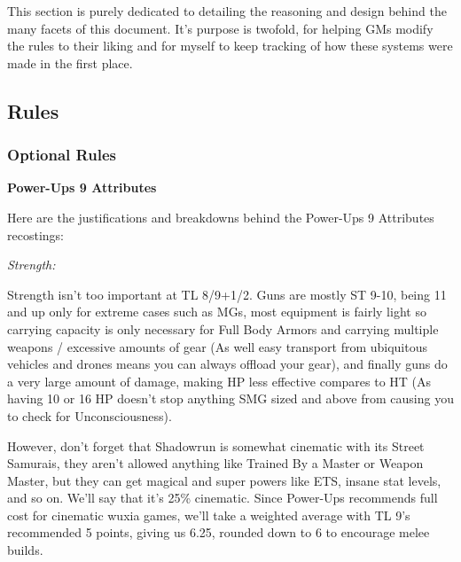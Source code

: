 


\begin{multicols*}{2}
	
	This section is purely dedicated to detailing the reasoning and design behind the many facets of this document. It's purpose is twofold, for helping GMs modify the rules to their liking and for myself to keep tracking of how these systems were made in the first place.
	
	\subsection{Rules}
	
	\subsubsection{Optional Rules}
	
	\textbf{Power-Ups 9 Attributes}\label{attributes_bhts}
	
	Here are the justifications and breakdowns behind the Power-Ups 9 Attributes recostings:
	
	\textit{Strength:}
	
	Strength isn’t too important at TL 8/9+1/2. Guns are mostly ST 9-10, being 11 and up only for extreme cases such as MGs, most equipment is fairly light so carrying capacity is only necessary for Full Body Armors and carrying multiple weapons / excessive amounts of gear (As well easy transport from ubiquitous vehicles and drones means you can always offload your gear), and finally guns do a very large amount of damage, making HP less effective compares to HT (As having 10 or 16 HP doesn’t stop anything SMG sized and above from causing you to check for Unconsciousness).
	
	However, don’t forget that Shadowrun is somewhat cinematic with its Street Samurais, they aren't allowed anything like Trained By a Master or Weapon Master, but they can get magical and super powers like ETS, insane stat levels, and so on. We'll say that it's 25\% cinematic. Since Power-Ups recommends full cost for cinematic wuxia games, we'll take a weighted average with TL 9's recommended 5 points, giving us 6.25, rounded down to 6 to encourage melee builds.
	

\end{multicols*}

